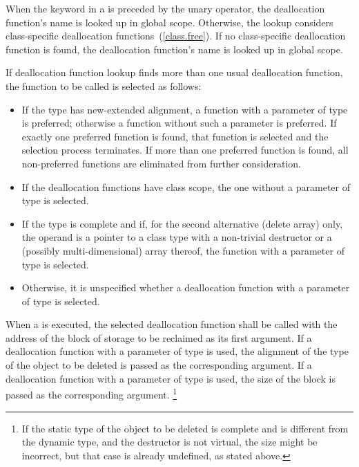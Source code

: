 \pnum
When the keyword  in a  is
preceded by the unary \tcode{::} operator, the deallocation function's name is looked
up in global scope. Otherwise, the lookup considers class-specific deallocation
functions~(\ref{class.free}). If no class-specific deallocation function is found,
the deallocation function's name is looked up in global scope.

\pnum
If deallocation function lookup finds more than one usual
deallocation function,
the function to be called is selected as follows:
\begin{itemize}
\item
If the type has new-extended alignment,
a function with a parameter of type  is preferred;
otherwise a function without such a parameter is preferred.
If exactly one preferred function is found,
that function is selected and the selection process terminates.
If more than one preferred function is found,
all non-preferred functions are eliminated from further consideration.
\item
If the deallocation functions have class scope,
the one without a parameter of type  is selected.
\item
If the type is complete and if, for the second alternative (delete
array) only, the operand is a pointer to a class type with a
non-trivial destructor or a (possibly multi-dimensional) array thereof,
the function with a parameter of type  is selected.
\item
Otherwise, it is unspecified
whether a deallocation function with a parameter of type 
is selected.
\end{itemize}

\pnum
When a 
is executed, the selected deallocation function shall be called with
the address of the block of storage to be reclaimed as its first argument.
If a deallocation function
with a parameter of type 
is used,
the alignment of the type of the object to be deleted
is passed as the corresponding argument.
If a deallocation function
with a parameter of type 
is used,
the size of the block
is passed as the corresponding argument.%
\footnote{If the static type of the object to be deleted is complete
and is different from the dynamic type, and the destructor is not virtual, the size might
be incorrect, but that case is already undefined, as stated above.}

